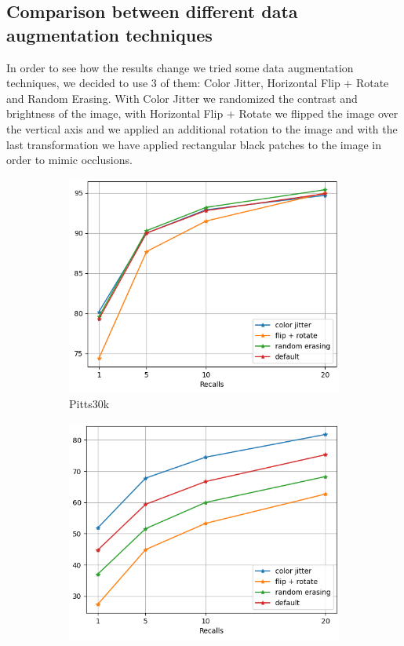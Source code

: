 \documentclass[10pt,twocolumn,letterpaper]{article}
\begin{document}
\subsection{Comparison between different data augmentation techniques}
In order to see how the results change we tried some data augmentation techniques, we decided to use 3 of them: Color Jitter, Horizontal Flip + Rotate and Random Erasing. With Color Jitter we randomized the contrast and brightness of the image, with Horizontal Flip + Rotate we flipped the image over the vertical axis and we applied an additional rotation to the image and with the last transformation we have applied rectangular black patches to the image in order to mimic occlusions.\\
\begin{figure}[!h]
	\centering
	\begin{subfigure}[b]{0.23\textwidth}
		\centering
		\includegraphics[width=\textwidth]{img/augment/test_pitts30k_recalls_graph.png}
		\caption{Pitts30k}
		\label{fig:recalls:augment:pitts30k}
	\end{subfigure}
	\hfill
	\begin{subfigure}[b]{0.23\textwidth}
		\centering
		\includegraphics[width=\textwidth]{img/augment/test_st_lucia_recalls_graph.png}

\end{subfigure}
\end{figure}
\end{document}
